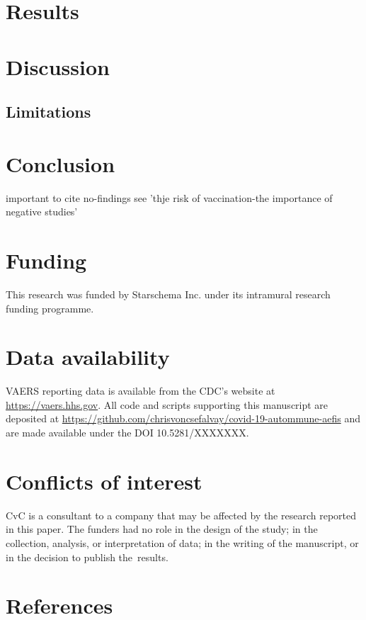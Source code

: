 \documentclass{article}
\begin{document}
\section{Results}

\section{Discussion}

\subsection{Limitations}


\section{Conclusion}

important to cite no-findings see 'thje risk of vaccination-the importance of negative studies'


\vspace{6pt}

\section*{Funding}

This research was funded by Starschema Inc. under its intramural research funding programme.

\section*{Data availability}

VAERS reporting data is available from the CDC's website at \url{https://vaers.hhs.gov}.
All code and scripts supporting this manuscript are deposited at
\url{https://github.com/chrisvoncsefalvay/covid-19-autommune-aefis} and are made available under the DOI 10.5281/XXXXXXX.

\section*{Conflicts of interest}

CvC is a consultant to a company that may be affected by the research reported in this paper.
The funders had no role in the design of the study;
in the collection, analysis, or interpretation of data;
in the writing of the manuscript, or in the decision to publish the~results.


\section*{References}


\end{document}
